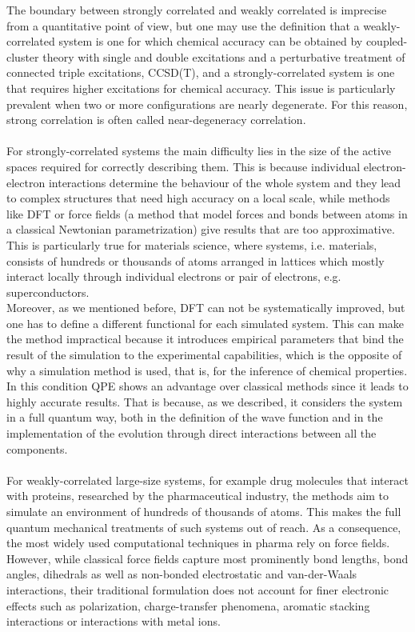 The boundary between strongly correlated and weakly correlated is imprecise from a quantitative point of view, but one may use the definition that a weakly-correlated system is one for which chemical accuracy can be obtained by coupled-cluster theory with single and double excitations and a perturbative treatment of connected triple excitations, CCSD(T), and a strongly-correlated system is one that requires higher excitations for chemical accuracy. This issue is particularly prevalent when two or more configurations are nearly degenerate. For this reason, strong correlation is often called near-degeneracy correlation. \\
\\
For strongly-correlated systems the main difficulty lies in the size of the active spaces required for correctly describing them. This is because individual electron-electron interactions determine the behaviour of the whole system and they lead to complex structures that need high accuracy on a local scale, while methods like DFT or force fields (a method that model forces and bonds between atoms in a classical Newtonian parametrization) give results that are too approximative. This is particularly true for materials science, where systems, i.e. materials, consists of hundreds or thousands of atoms arranged in lattices which mostly interact locally through individual electrons or pair of electrons, e.g. superconductors. \\
Moreover, as we mentioned before, DFT can not be systematically improved, but one has to define a different functional for each simulated system. This can make the method impractical because it introduces empirical parameters that bind the result of the simulation to the experimental capabilities, which is the opposite of why a simulation method is used, that is, for the inference of chemical properties. \\
In this condition QPE shows an advantage over classical methods since it leads to highly accurate results. That is because, as we described, it considers the system in a full quantum way, both in the definition of the wave function and in the implementation of the evolution through direct interactions between all the components. \\
\\
For weakly-correlated large-size systems, for example drug molecules that interact with proteins, researched by the pharmaceutical industry, the methods aim to simulate an environment of hundreds of thousands of atoms. This makes the full quantum mechanical treatments of such systems out of reach. As a consequence, the most widely used computational techniques in pharma rely on force fields. However, while classical force fields capture most prominently bond lengths, bond angles, dihedrals as well as non-bonded electrostatic and van-der-Waals interactions, their traditional formulation does not account for finer electronic effects such as polarization, charge-transfer phenomena, aromatic stacking interactions or interactions with metal ions. \\
